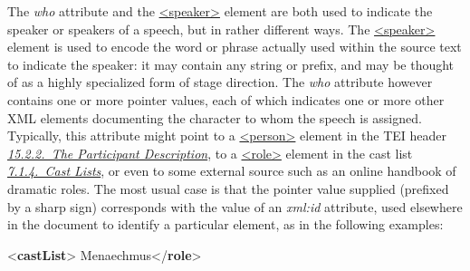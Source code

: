 The {\itshape who} attribute and the \hyperref[TEI.speaker]{<speaker>} element are both used to indicate the speaker or speakers of a speech, but in rather different ways. The \hyperref[TEI.speaker]{<speaker>} element is used to encode the word or phrase actually used within the source text to indicate the speaker: it may contain any string or prefix, and may be thought of as a highly specialized form of stage direction. The {\itshape who} attribute however contains one or more pointer values, each of which indicates one or more other XML elements documenting the character to whom the speech is assigned. Typically, this attribute might point to a \hyperref[TEI.person]{<person>} element in the TEI header \textit{\hyperref[CCAHPA]{15.2.2.\ The Participant Description}}, to a \hyperref[TEI.role]{<role>} element in the cast list \textit{\hyperref[DRCAST]{7.1.4.\ Cast Lists}}, or even to some external source such as an online handbook of dramatic roles. The most usual case is that the pointer value supplied (prefixed by a sharp sign) corresponds with the value of an {\itshape xml:id} attribute, used elsewhere in the document to identify a particular element, as in the following examples: \par\bgroup{}\exampleFont \begin{shaded}\noindent\mbox{}{<\textbf{castList}>}\mbox{}\newline 
{}\mbox{}\newline 
\hspace*{1em}Menaechmus{</\textbf{role}>}\mbox{}\newline 
{}\mbox{}\newline 
{}\mbox{}\newline 

\end{shaded}
